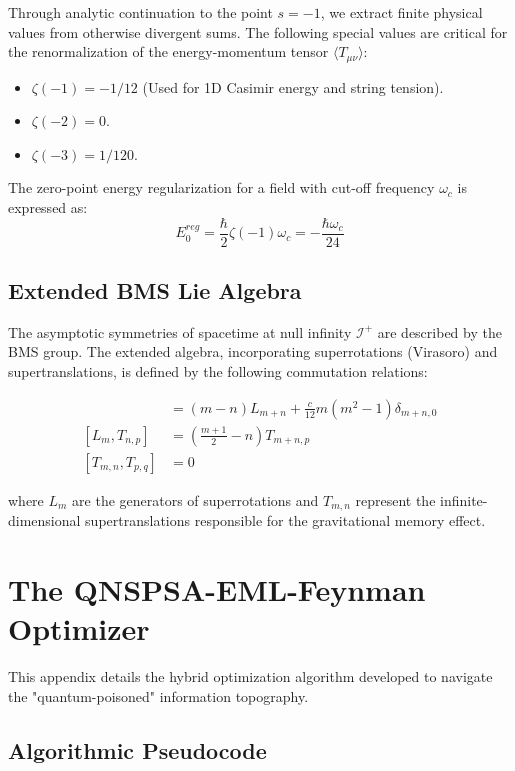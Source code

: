\documentclass[11pt,a4paper,spanish]{book}
\numberwithin{equation}{chapter}
\numberwithin{figure}{chapter}
\numberwithin{equation}{chapter}
\numberwithin{figure}{chapter}
\numberwithin{table}{chapter}
\begin{document}
Through analytic continuation to the point $s=-1$, we extract finite physical values from otherwise divergent sums. The following special values are critical for the renormalization of the energy-momentum tensor $\langle T_{\mu\nu} \rangle$:
\begin{itemize}
    \item $\zeta(-1) = -1/12$ (Used for 1D Casimir energy and string tension).
    \item $\zeta(-2) = 0$.
    \item $\zeta(-3) = 1/120$.
\end{itemize}
The zero-point energy regularization for a field with cut-off frequency $\omega_c$ is expressed as:
\begin{equation}
    E_0^{reg} = \frac{\hbar}{2} \zeta(-1) \omega_c = -\frac{\hbar \omega_c}{24}
\end{equation}

\section{Extended BMS Lie Algebra}

The asymptotic symmetries of spacetime at null infinity $\mathcal{I}^+$ are described by the BMS group. The extended algebra, incorporating superrotations (Virasoro) and supertranslations, is defined by the following commutation relations:

\begin{align}
    [L_m, L_n] &= (m-n)L_{m+n} + \frac{c}{12}m(m^2-1)\delta_{m+n,0} \\
    [L_m, T_{n,p}] &= \left(\frac{m+1}{2} - n\right) T_{m+n, p} \\
    [T_{m,n}, T_{p,q}] &= 0
\end{align}

where $L_m$ are the generators of superrotations and $T_{m,n}$ represent the infinite-dimensional supertranslations responsible for the gravitational memory effect.

\chapter{The QNSPSA-EML-Feynman Optimizer}
\label{app:algorithm}

This appendix details the hybrid optimization algorithm developed to navigate the "quantum-poisoned" information topography.

\section{Algorithmic Pseudocode}
\end{document}
